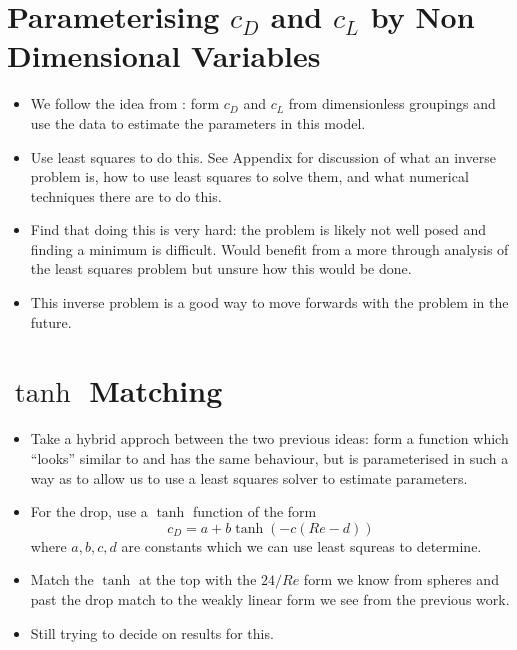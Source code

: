 \section{Parameterising $c_{D}$ and $c_{L}$ by Non Dimensional Variables}

\begin{itemize}
\item We follow the idea from \citet{Lieberman2001}: form $c_{D}$ and $c_{L}$ from dimensionless
groupings and use the data to estimate the parameters in this model.
\item Use least squares to do this. See Appendix for discussion of what an inverse problem is, how
to use least squares to solve them, and what numerical techniques there are to do this.
\item Find that doing this is very hard: the problem is likely not well posed and finding a minimum
is difficult. Would benefit from a more through analysis of the least squares problem but unsure how
this would be done.
\item This inverse problem is a good way to move forwards with the problem in the future.
\end{itemize}

\section{$\tanh$ Matching}

\begin{itemize}
\item Take a hybrid approch between the two previous ideas: form a function which ``looks'' similar
to \citet{Morrison2010} and has the same behaviour, but is parameterised in such a way as to allow
us to use a least squares solver to estimate parameters.
\item For the drop, use a $\tanh$ function of the form
\[
c_{D} = a + b \tanh (-c(Re - d))
\]
where $a,b,c,d$ are constants which we can use least squreas to determine.
\item Match the $\tanh$ at the top with the $24/Re$ form we know from spheres and past the drop match
to the weakly linear form we see from the previous work.
\item Still trying to decide on results for this.
\end{itemize}